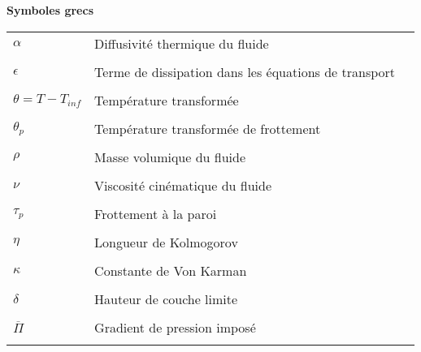 \vspace{1.5cm}
\noindent \textbf{Symboles grecs}
\vspace{-1.25cm}
\begin{center}
\begin{tabular}{ m{3cm} m{11.5cm} m{1cm} } 
\\
$\alpha$ & Diffusivité thermique du fluide &  \\
\\[-2.625em]
$\epsilon$ & Terme de dissipation dans les équations de transport &  \\
\\[-2.625em]
$\theta=T-T_{inf}$ & Température transformée &  \\
\\[-2.625em]
$\theta_{p}$ & Température transformée de frottement &  \\
\\[-2.625em]
$\rho$ & Masse volumique du fluide &  \\
\\[-2.625em]
$\nu$ & Viscosité cinématique du fluide &  \\
\\[-2.625em]
$\tau_{p}$ & Frottement à la paroi &  \\
\\[-2.625em]
$\eta$ & Longueur de Kolmogorov &  \\
\\[-2.625em]
$\kappa$ & Constante de Von Karman &  \\
\\[-2.625em]
$\delta$ & Hauteur de couche limite &  \\
\\[-2.625em]
$\overline{\Pi}$ & Gradient de pression imposé &  \\
\\[-2.625em]
\end{tabular}
\end{center}


